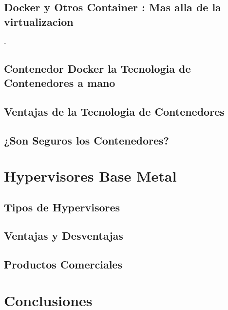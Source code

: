 \documentclass[%
 reprint,
 amsmath,amssymb,
 aps,
]{revtex4-1}
\begin{document}
\subsection{Docker y Otros Container : Mas alla de la virtualizacion}
- 
\subsection{Contenedor Docker la Tecnologia de Contenedores a mano}
\subsection{Ventajas de la Tecnologia de Contenedores}
\subsection{¿Son Seguros los Contenedores?}

\section {Hypervisores Base Metal}\label{sec:7}


\subsection{Tipos de Hypervisores}
\subsection{Ventajas y Desventajas}
\subsection{Productos Comerciales}

\section{Conclusiones}\label{sec:8}
\end{document}
